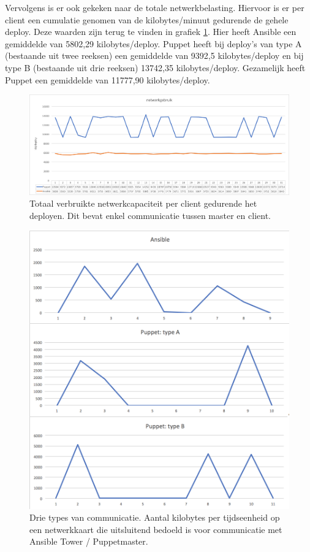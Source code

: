 Vervolgens is er ook gekeken naar de totale netwerkbelasting. Hiervoor is er per client een cumulatie genomen van de kilobytes/minuut gedurende de gehele deploy. Deze waarden zijn terug te vinden in grafiek \ref{fig:netwerkverbruik}. Hier heeft Ansible een gemiddelde van 5802,29 kilobytes/deploy. Puppet heeft bij deploy's van type A (bestaande uit twee reeksen) een gemiddelde van  9392,5 kilobytes/deploy en bij type B (bestaande uit drie reeksen) 13742,35 kilobytes/deploy. Gezamelijk heeft Puppet een gemiddelde van 11777,90 kilobytes/deploy. 


\begin{figure}
  \includegraphics[width=\linewidth]{img/netwerkverbruik.png}
 \caption{Totaal verbruikte netwerkcapaciteit per client gedurende het deployen. Dit bevat enkel communicatie tussen master en client.}  
  \label{fig:netwerkverbruik}
\end{figure}


\begin{figure}
  \includegraphics[width=\linewidth]{img/deploytypes.png}
 \caption{Drie types van communicatie. Aantal kilobytes per tijdseenheid op een netwerkkaart die uitsluitend bedoeld is voor communicatie met Ansible Tower / Puppetmaster. }  
  \label{fig:deploytypes}
\end{figure}

